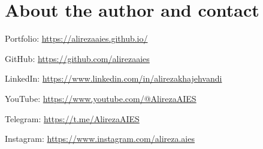 \chapter*{About the author and contact}
\AuthorName

Portfolio:
\url{https://alirezaaies.github.io/}

GitHub:
\url{https://github.com/alirezaaies}

LinkedIn:
\url{https://www.linkedin.com/in/alirezakhajehvandi}

YouTube:
\url{https://www.youtube.com/@AlirezaAIES}

Telegram:
\url{https://t.me/AlirezaAIES}

Instagram:
\url{https://www.instagram.com/alireza.aies}

